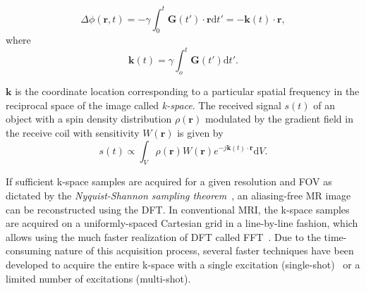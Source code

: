 \begin{equation}
	\label{eq:phaseaccrural}
	\Delta\phi(\textbf{r},t)=-\gamma\int_{0}^{t} \textbf{G}(t')\cdot\textbf{r} \text{d}t'=-\textbf{k}(t)\cdot\textbf{r},
\end{equation}
where 
\begin{equation}
	\label{eq:kspace}
	\textbf{k}(t)=\gamma\int_{o}^{t}\textbf{G}(t')\text{d}t'.
\end{equation}

$\textbf{k}$ is the coordinate location corresponding to a particular spatial frequency in the reciprocal space of the image called \emph{k-space}. The received signal $s(t)$ of an object with a spin density distribution $\rho(\textbf{r})$ modulated by the gradient field in the receive coil with sensitivity $W(\textbf{r})$ is given by 
\begin{equation}
	\label{eq:signal}
	s(t) \propto \int_V \rho(\textbf{r})W(\textbf{r})e^{-j\textbf{k}(t)\cdot\textbf{r}} \text{d}V.
\end{equation}

If sufficient k-space samples are acquired for a given resolution and \gls{FOV} as dictated by the \emph{Nyquist-Shannon sampling theorem}~\cite{shannonCommunicationPresenceNoise1949}, an aliasing-free MR image can be reconstructed using the \gls{DFT}. In conventional \gls{MRI}, the k-space samples are acquired on a uniformly-spaced Cartesian grid in a line-by-line fashion, which allows using the much faster realization of \gls{DFT} called \gls{FFT}~\cite{cooleyAlgorithmMachineCalculation1965}. Due to the time-consuming nature of this acquisition process, several faster techniques have been developed to acquire the entire k-space with a single excitation (single-shot)~\cite{mansfieldMultiplanarImageFormation1977} or a limited number of excitations (multi-shot).